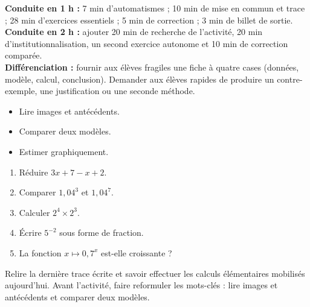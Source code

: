 \ifprof
\begin{methode}
\textbf{Conduite en 1 h :} 7 min d'automatismes ; 10 min de mise en commun et trace ; 28 min d'exercices essentiels ; 5 min de correction ; 3 min de billet de sortie.\\
\textbf{Conduite en 2 h :} ajouter 20 min de recherche de l'activité, 20 min d'institutionnalisation, un second exercice autonome et 10 min de correction comparée.\\
\textbf{Différenciation :} fournir aux élèves fragiles une fiche à quatre cases (données, modèle, calcul, conclusion). Demander aux élèves rapides de produire un contre-exemple, une justification ou une seconde méthode.
\end{methode}
\fi
{}
\begin{objectifs}\begin{itemize}\item Lire images et antécédents.\item Comparer deux modèles.\item Estimer graphiquement.\end{itemize}\end{objectifs}
\begin{automatismes}\begin{enumerate}\item Réduire $3x+7-x+2$. \item Comparer $1{,}04^3$ et $1{,}04^7$. \item Calculer $2^4\times2^3$. \item Écrire $5^{-2}$ sous forme de fraction. \item La fonction $x\mapsto0{,}7^x$ est-elle croissante ? \end{enumerate}\end{automatismes}
\begin{prerequis}Relire la dernière trace écrite et savoir effectuer les calculs élémentaires mobilisés aujourd'hui. Avant l'activité, faire reformuler les mots-clés : lire images et antécédents et comparer deux modèles.\end{prerequis}

